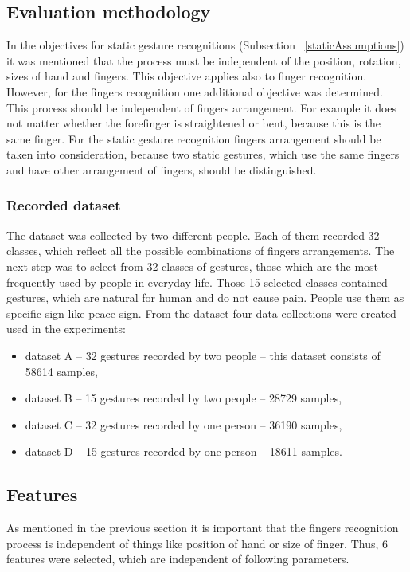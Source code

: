 \subsection{Evaluation methodology} \label{fdEvaluationMethodology}
In the objectives for static gesture recognitions (Subsection ~\ref{staticAssumptions}) it was mentioned that the process must be independent of the position, rotation, sizes of hand and fingers. This objective applies also to finger recognition. However, for the fingers recognition one additional objective was determined. This process should be independent of fingers arrangement. For example it does not matter whether the forefinger is straightened or bent, because this is the same finger. For the static gesture recognition fingers arrangement should be taken into consideration, because two static gestures, which use the same fingers and have other arrangement of fingers, should be distinguished.

\subsubsection*{Recorded dataset}
The dataset was collected by two different people. Each of them  recorded 32 classes, which reflect all the possible combinations of fingers arrangements. The next step was to select from 32 classes of gestures, those which are the most frequently used by people in everyday life. Those 15 selected classes contained gestures, which are natural for human and do not cause pain. People use them as specific sign like peace sign. From the dataset four data collections were created used in the experiments:
\begin{itemize}
\item dataset A -- 32 gestures recorded by two people -- this dataset consists of 58614 samples,
\item dataset B -- 15 gestures recorded by two people -- 28729 samples,
\item dataset C -- 32 gestures recorded by one person -- 36190 samples,
\item dataset D -- 15 gestures recorded by one person -- 18611 samples.
\end{itemize}

\subsection{Features}
As mentioned in the previous section it is important that the fingers recognition process is independent of things like position of hand or size of finger. Thus, 6 features were selected, which are independent of following parameters. 

